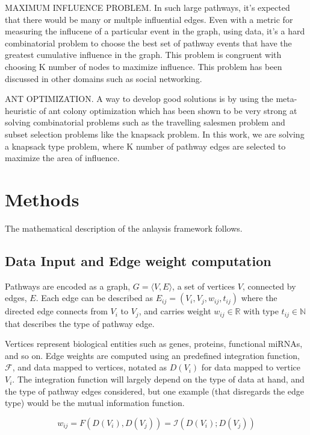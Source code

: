 \documentclass[twoside]{article}
\begin{document}
\begin{multicols}{2}
MAXIMUM INFLUENCE PROBLEM. In such large pathways, it's expected that there would be many or
multple influential edges. Even with a metric for measuring the
influcene of a particular event in the graph, using data, it's a hard
combinatorial problem to choose the best set of pathway events that
have the greatest cumulative influence in the graph. This problem is
congruent with choosing K number of nodes to maximize influence. This
problem has been discussed in other domains such as social
networking. 

ANT OPTIMIZATION. A way to develop good solutions is by using the meta-heuristic of ant
colony optimization which has been shown to be very strong at solving
combinatorial problems such as the travelling salesmen problem and
subset selection problems like the knapsack problem. In this work, we
are solving a knapsack type problem, where K number of pathway edges
are selected to maximize the area of influence.



\section{Methods}

The mathematical description of the anlaysis framework follows.

\subsection{Data Input and Edge weight computation}

Pathways are encoded as a graph, $G = \langle V, E \rangle$, a set of vertices $V$,
connected by edges, $E$. Each edge can be described as $E_{ij} = (V_i ,
V_j, w_{ij}, t_{ij})$ where the directed edge connects from $V_i$ to $V_j$,
and carries weight $w_{ij} \in \mathbb{R}$ with type $t_{ij} \in \mathbb{N}$ that describes the
type of pathway edge.

Vertices represent biological entities such as genes, proteins,
functional miRNAs, and so on. Edge weights are computed using an
predefined integration function, $\mathcal{F}$, and data
mapped to vertices, notated as $D(V_i)$ for data mapped to vertice
$V_i$. The integration function will largely depend on the type of
data at hand, and the type of pathway edges considered,
but one example (that disregards the edge type) 
would be the mutual information function.

\begin{equation}
\label{integration-function}
w_{ij} = F(D(V_{i}) , D(V_{j})) = \mathcal{I} (D(V_{i}) ; D(V_{j}))
\end{equation}


\end{multicols}
\end{document}
